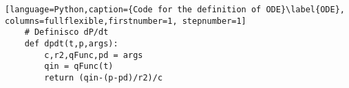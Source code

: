 \begin{lstlisting}[language=Python,caption={Code for the definition of ODE}\label{ODE}, columns=fullflexible,firstnumber=1, stepnumber=1]
    # Definisco dP/dt
    def dpdt(t,p,args):
        c,r2,qFunc,pd = args
        qin = qFunc(t)
        return (qin-(p-pd)/r2)/c
\end{lstlisting}
